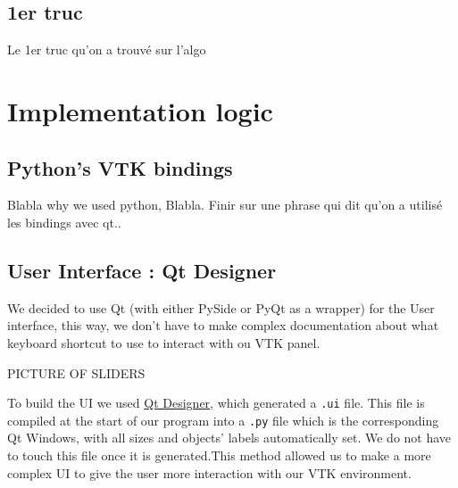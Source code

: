 \documentclass[10pt,twocolumn,letterpaper]{article}
\def\code#1{\texttt{#1}}
\begin{document}
    \subsection{1er truc}

Le 1er truc qu'on a trouvé sur l'algo


\section{Implementation logic}

    \subsection{Python's VTK bindings}

Blabla why we used python, Blabla.
Finir sur une phrase qui dit qu'on a utilisé les bindings avec qt..

    \subsection{User Interface : Qt Designer}

    We decided to use Qt (with either PySide or PyQt as a wrapper) for the User
interface, this way, we don't have to make complex documentation about what
keyboard shortcut to use to interact with ou VTK panel. 

PICTURE OF SLIDERS

To build the UI we used \href{https://doc.qt.io/qt-5/qtdesigner-manual.html}{Qt Designer},
which generated a \code{.ui} file. This file is compiled at the start of our
program into a \code{.py} file which is the corresponding Qt Windows, with all
sizes and objects' labels automatically set. We do not have to touch this file
once it is generated.This method allowed us to make a more complex UI to give
the user more interaction with our VTK environment.


\end{document}
